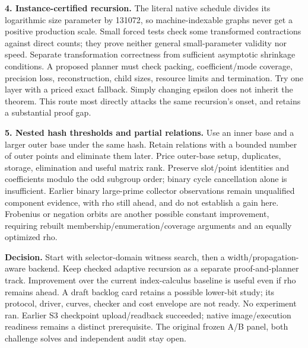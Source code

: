 \documentclass[10pt]{article}
\begin{document}
\medskip\noindent\textbf{4. Instance-certified recursion.}
The literal native schedule divides its logarithmic size parameter by
131072, so machine-indexable graphs never get a positive production scale.
Small forced tests check some transformed contractions against direct counts;
they prove neither general small-parameter validity nor speed. Separate
transformation correctness from sufficient asymptotic shrinkage conditions.
A proposed planner must check packing, coefficient/mode coverage, precision
loss, reconstruction, child sizes, resource limits and termination. Try one
layer with a priced exact fallback. Simply changing epsilon does not inherit
the theorem. This route most directly attacks the same recursion's onset,
and retains a substantial proof gap.

\medskip\noindent\textbf{5. Nested hash thresholds and partial relations.}
Use an inner base and a larger outer base under the same hash. Retain
relations with a bounded number of outer points and eliminate them later.
Price outer-base setup, duplicates, storage, elimination and useful matrix
rank. Preserve slot/point identities and coefficients modulo the odd subgroup
order; binary cycle cancellation alone is insufficient. Earlier binary
large-prime collector observations remain unqualified component evidence,
with rho still ahead, and do not establish a gain here. Frobenius or negation
orbits are another possible constant improvement, requiring rebuilt
membership/enumeration/coverage arguments and an equally optimized rho.

\medskip\noindent\textbf{Decision.}
Start with selector-domain witness search, then a width/propagation-aware
backend. Keep checked adaptive recursion as a separate proof-and-planner
track. Improvement over the current index-calculus baseline is useful even
if rho remains ahead. A draft backlog card retains a possible lower-bit
study; its protocol, driver, curves, checker and cost envelope are not ready.
No experiment ran. Earlier S3 checkpoint upload/readback succeeded; native
image/execution readiness remains a distinct prerequisite. The original
frozen A/B panel, both challenge solves and independent audit stay open.
\end{document}

